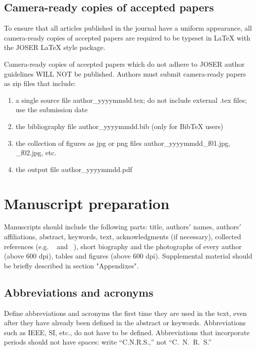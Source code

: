 \documentclass[10pt,journal,compsoc]{joser1}
\begin{document}
\subsection{Camera-ready copies of accepted papers}
To ensure that all articles published in the journal have a
uniform appearance, all camera-ready copies of accepted papers are
required to be typeset in LaTeX with the JOSER LaTeX style
package.

Camera-ready copies of accepted papers which do not adhere to JOSER author guidelines WILL NOT be published. Authors must submit camera-ready papers as zip files that include:
\begin{enumerate}
    \item a single source file author\_yyyymmdd.tex; do not include external .tex files; use the submission date
    \item the bibliography file author\_yyyymmdd.bib (only for BibTeX users)
    \item the collection of figures as jpg or png files author\_yyyymmdd\_f01.jpg, \_f02.jpg, etc.
    \item the output file author\_yyyymmdd.pdf
\end{enumerate}


\section{Manuscript preparation}
Manuscripts should include the following parts: title, authors$'$
names, authors$'$ affiliations, abstract, keywords, text,
acknowledgments (if necessary), collected references (e.g.
~\cite{IJSEK1996:Stewart, SEER2007:Vaughan, ROBIO2006:Friedmann,
SIMPAR2008:Petters} and ~\cite{JARS2006:Colon, IJAR2001:Zielinski,
IEEE-TSE1997:Stewart, ICIAS2008:Spexard,
IROS2003:Montemerlo}), short
biography and the photographs of every author (above 600 dpi),
tables and figures (above 600 dpi). Supplemental material should
be briefly described in section "Appendixes".

\subsection{Abbreviations and acronyms}
Define abbreviations and acronyms the first time they are used in
the text, even after they have already been defined in the abstract
or keywords. Abbreviations such as IEEE, SI, etc., do not have
to be defined. Abbreviations that incorporate periods should not
have spaces: write ``C.N.R.S.,'' not ``C.\ N.\ R.\ S.''
\end{document}
